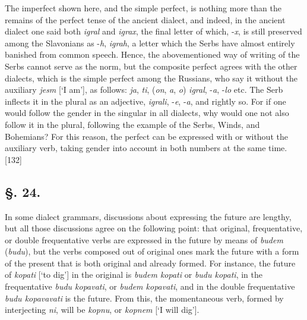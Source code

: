 The imperfect shown here, and the simple perfect, is nothing more than the remains of the perfect tense of the ancient dialect, and indeed, in the ancient dialect one said both \textit{igral} and \textit{igrax}, the final letter of which, -\textit{x}, is still preserved among the Slavonians as -\textit{h}, \textit{igrah}, a letter which the Serbs have almost entirely banished from common speech. Hence, the abovementioned way of writing of the Serbs cannot serve as the norm, but the composite perfect agrees with the other dialects, which is the simple perfect among the Russians, who say it without the auxiliary \textit{jesm} [‘I am’], as follows: \textit{ja}, \textit{ti}, (\textit{on}, \textit{a}, \textit{o}) \textit{igral}, -\textit{a}, -\textit{lo} etc. The Serb inflects it in the plural as an adjective, \textit{igrali}, -\textit{e}, -\textit{a}, and rightly so. For if one would follow the gender in the singular in all dialects, why would one not also follow it in the plural, following the example of the Serbs, Winds, and Bohemians? For this reason, the perfect can be expressed with or without the auxiliary verb, taking gender into account in both numbers at the same time. [132]

\subsection*{\hspace*{\fill}§. 24.\hspace*{\fill}}

In some dialect grammars, discussions about expressing the future are lengthy, but all those discussions agree on the following point: that original, frequentative, or double frequentative verbs are expressed in the future by means of \textit{budem} (\textit{budu}), but the verbs composed out of original ones mark the future with a form of the present that is both original and already formed. For instance, the future of \textit{kopati} [‘to dig’] in the original is \textit{budem kopati} or \textit{budu kopati}, in the frequentative \textit{budu kopavati}, or \textit{budem kopavati}, and in the double frequentative \textit{budu kopavavati} is the future. From this, the momentaneous verb, formed by interjecting \textit{ni}, will be \textit{kopnu}, or \textit{kopnem} [‘I will dig’].

